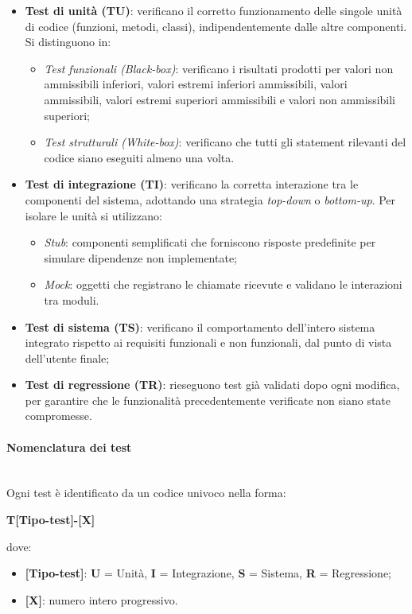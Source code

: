 \documentclass[10pt, letterpaper]{article}
\newcommand{\trisubsection}[1]{\paragraph{#1}\mbox{}\\}
\begin{document}
\begin{itemize}
    \item \textbf{Test di unità (TU)}: verificano il corretto funzionamento delle singole unità di codice (funzioni, metodi, classi), indipendentemente dalle altre componenti. Si distinguono in:
    \begin{itemize}
        \item \textit{Test funzionali (Black-box)}: verificano i risultati prodotti per valori non ammissibili inferiori, valori estremi inferiori ammissibili, valori ammissibili, valori estremi superiori ammissibili e valori non ammissibili superiori;
        \item \textit{Test strutturali (White-box)}: verificano che tutti gli statement rilevanti del codice siano eseguiti almeno una volta.
    \end{itemize}
    \item \textbf{Test di integrazione (TI)}: verificano la corretta interazione tra le componenti del sistema, adottando una strategia \textit{top-down} o \textit{bottom-up}. Per isolare le unità si utilizzano:
    \begin{itemize}
        \item \textit{Stub}: componenti semplificati che forniscono risposte predefinite per simulare dipendenze non implementate;
        \item \textit{Mock}: oggetti che registrano le chiamate ricevute e validano le interazioni tra moduli.
    \end{itemize}
    \item \textbf{Test di sistema (TS)}: verificano il comportamento dell'intero sistema integrato rispetto ai requisiti funzionali e non funzionali, dal punto di vista dell'utente finale;
    \item \textbf{Test di regressione (TR)}: rieseguono test già validati dopo ogni modifica, per garantire che le funzionalità precedentemente verificate non siano state compromesse.
\end{itemize}

\trisubsection{Nomenclatura dei test}
Ogni test è identificato da un codice univoco nella forma:
\begin{center}
    \textbf{T[Tipo-test]-[X]}
\end{center}
dove:
\begin{itemize}
    \item \textbf{[Tipo-test]}: \textbf{U} = Unità, \textbf{I} = Integrazione, \textbf{S} = Sistema, \textbf{R} = Regressione;
    \item \textbf{[X]}: numero intero progressivo.
\end{itemize}
\end{document}
